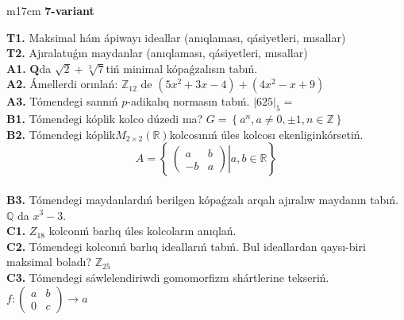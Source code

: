 \documentclass{article}
\begin{document}
\begin{tabular}{m{17cm}}
\textbf{7-variant}
\newline

\textbf{T1.} Maksimal hám ápiwayı ideallar (anıqlaması, qásiyetleri, mısallar) \\
\textbf{T2.} Ajıralatuǵın maydanlar (anıqlaması, qásiyetleri, mısallar) \\
\textbf{A1.} \(\mathbf{Q}\)da \(\sqrt{2} + \sqrt[3]{7}\)tiń minimal kópaǵzalısın tabıń. \\
\textbf{A2.} Ámellerdi orınlań: \(\mathbb{Z}_{12}\) de \(\left( 5x^{2} + 3x - 4 \right) + \left( 4x^{2} - x + 9 \right)\) \\
\textbf{A3.} Tómendegi sannıń \(p\)-adikalıq normasın tabıń. \(|625|_{5} =\) \\
\textbf{B1.} Tómendegi kóplik kolco dúzedi ma? \(G = \left\{ a^{n},a \neq 0, \pm 1,n \in \mathbb{Z} \right\}\) \\
\textbf{B2.} Tómendegi kóplik\(M_{2 \times 2}\left( \mathbb{R} \right)\)kolcosınıń úles kolcosı ekenliginkórsetiń.
\[A = \left\{ \left. \ \begin{pmatrix}
a & b \\
 - b & a
\end{pmatrix} \right|a,b\mathbb{\in R} \right\}\] \\
\textbf{B3.} Tómendegi maydanlardıń berilgen kópaǵzalı arqalı ajıralıw maydanın tabıń. \(\mathbb{Q}\) da \(x^{3} - 3\). \\
\textbf{C1.} \(Z_{18}\) kolconıń barlıq úles kolcoların anıqlań. \\
\textbf{C2.} Tómendegi kolconıń barlıq ideallarıń tabıń. Bul ideallardan qaysı-biri maksimal boladı? \(\mathbb{Z}_{25}\) \\
\textbf{C3.} Tómendegi sáwlelendiriwdi gomomorfizm shártlerine tekseriń. \(f:\begin{pmatrix}
a & b \\
0 & c
\end{pmatrix} \rightarrow a\) \\

\end{tabular}
\vspace{1cm}
\end{document}
